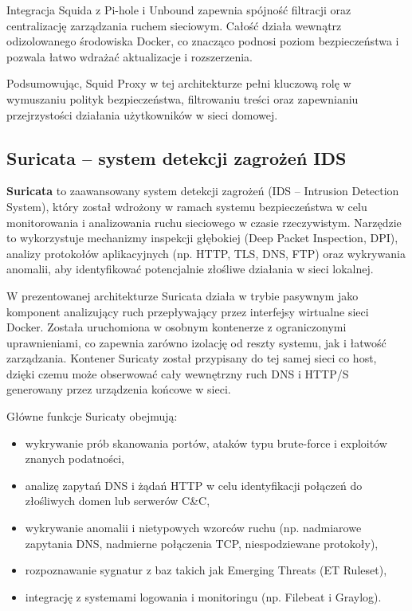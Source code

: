 \documentclass[
    left=2.5cm,         %
    right=2.5cm,        %
    top=2.5cm,          %
    bottom=3cm,         %
    bindingoffset=6mm,  %
    nohyphenation=true %
]{eiti/eiti-thesis} %
\begin{document}
Integracja Squida z Pi-hole i Unbound zapewnia spójność filtracji oraz centralizację zarządzania ruchem sieciowym. Całość działa wewnątrz odizolowanego środowiska Docker, co znacząco podnosi poziom bezpieczeństwa i pozwala łatwo wdrażać aktualizacje i rozszerzenia.

Podsumowując, Squid Proxy w tej architekturze pełni kluczową rolę w wymuszaniu polityk bezpieczeństwa, filtrowaniu treści oraz zapewnianiu przejrzystości działania użytkowników w sieci domowej.

\subsection{Suricata – system detekcji zagrożeń IDS}

\textbf{Suricata}\cite{suricata-wiki} to zaawansowany system detekcji zagrożeń (IDS – Intrusion Detection System), który został wdrożony w ramach systemu bezpieczeństwa w celu monitorowania i analizowania ruchu sieciowego w czasie rzeczywistym. Narzędzie to wykorzystuje mechanizmy inspekcji głębokiej (Deep Packet Inspection, DPI), analizy protokołów aplikacyjnych (np. HTTP, TLS, DNS, FTP) oraz wykrywania anomalii, aby identyfikować potencjalnie złośliwe działania w sieci lokalnej\cite{suricata-docs}.

W prezentowanej architekturze Suricata\cite{config-suricata} działa w trybie pasywnym jako komponent analizujący ruch przepływający przez interfejsy wirtualne sieci Docker. Została uruchomiona w osobnym kontenerze z ograniczonymi uprawnieniami, co zapewnia zarówno izolację od reszty systemu, jak i łatwość zarządzania. Kontener Suricaty został przypisany do tej samej sieci co host, dzięki czemu może obserwować cały wewnętrzny ruch DNS i HTTP/S generowany przez urządzenia końcowe w sieci\cite{suricata-docs}.

Główne funkcje Suricaty obejmują:
\begin{itemize}
    \item wykrywanie prób skanowania portów, ataków typu brute-force i exploitów znanych podatności,
    \item analizę zapytań DNS i żądań HTTP w celu identyfikacji połączeń do złośliwych domen lub serwerów C\&C,
    \item wykrywanie anomalii i nietypowych wzorców ruchu (np. nadmiarowe zapytania DNS, nadmierne połączenia TCP, niespodziewane protokoły),
    \item rozpoznawanie sygnatur z baz takich jak Emerging Threats (ET Ruleset),
    \item integrację z systemami logowania i monitoringu (np. Filebeat i Graylog).
\end{itemize}
\end{document}
